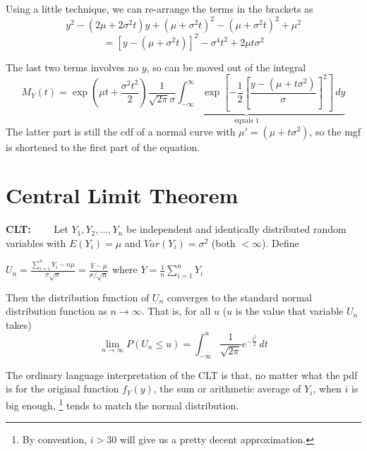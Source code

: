 \documentclass[11pt]{article}
\begin{document}
Using a little technique,  we can re-arrange the terms in the brackets as
$$ y^2 - (2\mu + 2 \sigma^2 t)y + (\mu + \sigma^2t) ^2 -(\mu + \sigma^2t) ^2  + \mu^2 $$
$$ = [y - (\mu + \sigma^2 t)] ^2 - \sigma^4 t^2 + 2 \mu t \sigma^2 $$

The last two terms involves no $y$,  so can be moved out of the integral
$$
M_Y(t) = \exp \left( \mu t + \frac{\sigma^2 t^2}{2} \right)  \underbrace{ \frac{1}{\sqrt{2\pi} \sigma}  \int _{-\infty} ^\infty \exp \left[ - \frac{1}{2}\left[ \frac{y - (\mu + t \sigma^2)}{\sigma} \right]^2 \right] \, dy } _\textrm{equals 1}
$$
The latter part is still the cdf of a normal curve with $\mu' = (\mu + t\sigma^2)$,  so the mgf is shortened to the first part of the equation. 




\section {\large Central Limit Theorem}


\begin{tcolorbox}[
	enhanced, 
	width=\textwidth, 
	fontupper=\normalsize,%
	drop fuzzy shadow southwest,
	boxrule=0.4pt,
	sharp corners,
	colframe=yellow!80!black,
	colback=yellow!10]
	
\textbf{\color{RoyalBlue} CLT:} \ \ \ \ Let $Y_1,Y_2, \dots, Y_n$ be independent and identically distributed random variables with $E(Y_i) = \mu$ and $ Var (Y_i) = \sigma^2$ (both $< \infty$).  Define
\begin{center}
$ \displaystyle U_n = \frac{\displaystyle \sum ^n _{i=1} Y_i - n \mu}{\sigma \sqrt{n} } = \frac{ {\overline {Y} } - \mu}{\sigma / \sqrt{n} }$  \hspace{10pt} where $\overline {Y} = \displaystyle \frac{1}{n} \sum _{i=1} ^n Y_i$
\end{center}
Then the distribution function of $U_n$ converges to the standard normal distribution function as $n \to \infty$.  That is,  for all $u$ ($u$ is the value that variable $U_n$ takes)
$$
\lim _{n \to \infty} P (U_n \leqslant u) = \int _{-\infty} ^u \frac{1}{\sqrt{2 \pi} } e^{-\frac{t^2}{2}} \, dt
$$

\end{tcolorbox}


The ordinary language interpretation of the CLT is that,  no matter what the pdf is for the original function $f_Y(y)$,  the sum or arithmetic average of $Y_i$,  when $i$ is big enough, \footnote{By convention,  $i>30$ will give us a pretty decent approximation.}  tends to match the normal distribution.    
\end{document}
